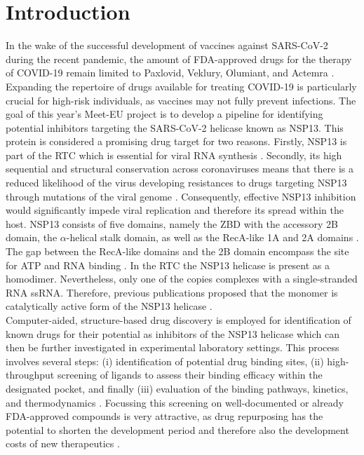 \documentclass[11pt, letterpaper, titlepage]{article}
\renewcommand{\cite}{\parencite}
\begin{document}
\section{Introduction}
In the wake of the successful development of vaccines against \ac{SARS-CoV-2} during the recent pandemic, the amount of FDA-approved drugs for the therapy of \ac{COVID-19} remain limited to Paxlovid, Veklury, Olumiant, and Actemra \cite{FDACOVID}. Expanding the repertoire of drugs available for treating \ac{COVID-19} is particularly crucial for high-risk individuals, as vaccines may not fully prevent infections. The goal of this year's Meet-EU project is to develop a pipeline for identifying potential inhibitors targeting the SARS-CoV-2 helicase known as \ac{NSP13}.
This protein is considered a promising drug target for two reasons. Firstly, \ac{NSP13} is part of the \ac{RTC} which is essential for viral RNA synthesis \cite{Malone_2022}. Secondly, its high sequential and structural conservation across coronaviruses means that there is a reduced likelihood of the virus developing resistances to drugs targeting \ac{NSP13} through mutations of the viral genome \cite{Spratt_2021}. Consequently, effective \ac{NSP13} inhibition would significantly impede viral replication and therefore its spread within the host. 
\ac{NSP13} consists of five domains, namely the \ac{ZBD} with the accessory 2B domain, the $\alpha$-helical stalk domain, as well as the RecA-like 1A and 2A domains \cite{Marecki}. The gap between the RecA-like domains and the 2B domain encompass the site for ATP and RNA binding \cite{NSP13_basics}. In the \ac{RTC} the NSP13 helicase is present as a homodimer. Nevertheless, only one of the copies complexes with a single-stranded RNA \ac{ssRNA}. Therefore, previous publications proposed that the monomer is catalytically active form of the \ac{NSP13} helicase \cite{Berta_2021}. \\

\noindent Computer-aided, structure-based drug discovery is employed for identification of known drugs for their potential as inhibitors of the \ac{NSP13} helicase which can then be further investigated in experimental laboratory settings. This process involves several steps: (i) identification of potential drug binding sites, (ii) high-throughput screening of ligands to assess their binding efficacy within the  designated pocket, and finally (iii) evaluation of the binding pathways, kinetics, and thermodynamics \cite{Sledz_2018}. Focussing this screening on well-documented or already FDA-approved compounds is very attractive, as drug repurposing has the potential to shorten the development period and therefore also the development costs of new therapeutics \cite{Pushpakom_2019}.
\end{document}
